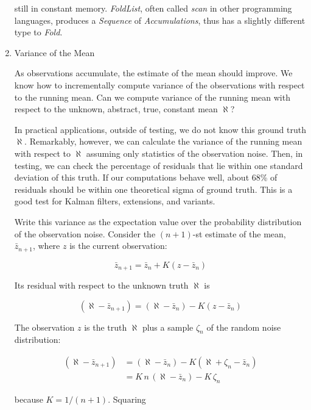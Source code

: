 \documentclass[10pt,oneside,x11names]{article}
\begin{document}
\begin{enumerate}
\noindent still in constant memory. \emph{FoldList}, often called \emph{scan} in other
programming languages, produces a \emph{Sequence} of \emph{Accumulations}, thus has a
slightly different type to \emph{Fold}.

\item Variance of the Mean
\label{sec:orgheadline11}

As observations accumulate, the estimate of the mean should improve. We know
how to incrementally compute variance of the observations with respect
to the running mean. Can we compute variance of the running mean with respect
to the unknown, abstract, true, constant mean \(\aleph\)?

In practical applications, outside of testing, we do not know this ground truth
\(\aleph\). Remarkably, however, we can calculate the variance of the running mean
with respect to \(\aleph\) assuming only statistics of the observation noise.
Then, in testing, we can check the percentage of residuals that lie within one
standard deviation of this truth. If our computations behave well, about 68\% of
residuals should be within one theoretical sigma of ground truth. This is a good
test for Kalman filters, extensions, and variants.

Write this variance as the expectation value over the probability distribution
of the observation noise.
Consider the \((n+1)\)-st estimate of the mean, \(\bar{z}_{n+1}\), where
\(z\) is the current observation:

\begin{equation}
\bar{z}_{n+1} = \bar{z}_n + K (z-\bar{z}_n)
\end{equation}

\noindent Its residual with respect to the unknown truth \(\aleph\) is

\begin{equation}
(\aleph-\bar{z}_{n+1}) = (\aleph-\bar{z}_n) - K (z-\bar{z}_n)
\end{equation}

\noindent The observation \(z\) is the truth \(\aleph\) plus a sample \(\zeta_n\) of
the random noise distribution:

\begin{align}
(\aleph-\bar{z}_{n+1})
&=
(\aleph-\bar{z}_n) - K (\aleph+\zeta_n-\bar{z}_n) \\
&=
K\, n\, (\aleph - \bar{z}_n)-K\,\zeta_n
\end{align}

\noindent because \(K=1/(n+1)\). Squaring


\end{enumerate}
\end{document}
